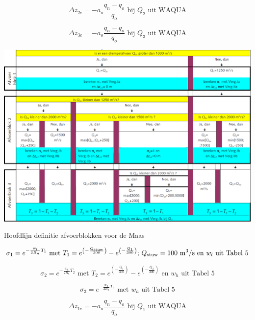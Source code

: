 \begin{equation}
\Delta z_{2e} = -a_o \frac{q_n - q_o}{q_o} \text{ bij $Q_2$ uit WAQUA}
\end{equation}

\begin{equation}
\Delta z_{3e} = -a_o \frac{q_n - q_o}{q_o} \text{ bij $Q_3$ uit WAQUA}
\end{equation}

\begin{table}
\includegraphics[width=\columnwidth]{figures/Tab8.png}
\caption{Hoofdlijn definitie afvoerblokken voor de Maas}
\label{Tab8}
\end{table}

\begin{equation}
\sigma_1 = e^{-\frac{w_l}{2 B_n} T_1} \text{ met } T_1 = e^{\left ( - \frac{Q_\text{stuw}}{300} \right )} - e^{\left ( - \frac{Q_1}{300} \right )} \text{; $Q_\text{stuw} = 100$ m\textsuperscript{3}/s en $w_l$ uit Tabel 5}
\end{equation}

\begin{equation}
\sigma_2 = e^{-\frac{w_h}{2 B_n} T_2} \text{ met } T_2 = e^{\left ( - \frac{Q_1}{300} \right )} - e^{\left ( - \frac{Q_2}{300} \right )} \text{ en $w_h$ uit Tabel 5}
\end{equation}

\begin{equation}
\sigma_3 = e^{-\frac{w_h}{2 B_n} T_3} \text{ met $w_h$ uit Tabel 5}
\end{equation}

\begin{equation}
\Delta z_{1e} = -a_o \frac{q_n - q_o}{q_o} \text{ bij $Q_1$ uit WAQUA}
\end{equation}

